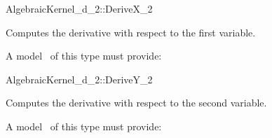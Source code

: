 \begin{ccRefConcept}{AlgebraicKernel_d_2::DeriveX_2}

\ccDefinition
Computes the derivative with respect to the first variable.


A model \ccVar\ of this type must provide:

{}

\end{ccRefConcept}
\begin{ccRefConcept}{AlgebraicKernel_d_2::DeriveY_2}

\ccDefinition
Computes the derivative with respect to the second variable.


A model \ccVar\ of this type must provide:

{}

\end{ccRefConcept}
